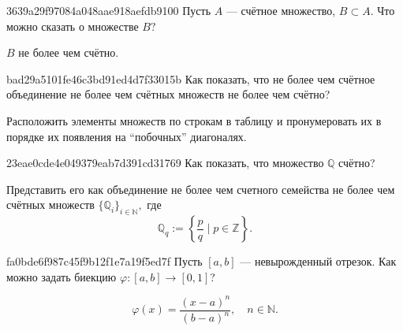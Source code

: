     \begin{note}{3639a29f97084a048aae918aefdb9100}
        Пусть $A$ --- счётное множество, \( B \subset A. \) Что можно сказать о
        множестве \( B? \)

        \begin{cloze}{1}
            \( B \) не более чем счётно.
        \end{cloze}
    \end{note}

    \begin{note}{bad29a5101fe46c3bd91ed4d7f33015b}
        Как показать, что не более чем счётное объединение не более чем счётных
        множеств не более чем счётно?

        \begin{cloze}{1}
            Расположить элементы множеств по строкам в таблицу и пронумеровать
            их в порядке их появления на ``побочных'' диагоналях.
        \end{cloze}
    \end{note}

    \begin{note}{23eae0cde4e049379eab7d391cd31769}
        Как показать, что множество \( \mathbb Q  \) счётно?

        \begin{cloze}{1}
            Представить его как объединение не более чем счетного семейства не
            более чем счётных множеств \( \{ \mathbb Q _i \}_{i \in \mathbb N }
            , \) где \[
                \mathbb Q _q := \left\{ \frac{p}{q} \mid p \in \mathbb Z  \right\}.
            \]
        \end{cloze}
    \end{note}

    \begin{note}{fa0bde6f987c45f9b12f1e7a19f5ed7f}
        Пусть \( [a,  b] \) --- невырожденный отрезок. Как можно задать биекцию
        \( \varphi : [a,  b] \to [0, 1] \)?

        \begin{cloze}{1}
            \[
                \varphi(x) = \frac{(x - a)^{n}}{(b - a)^{n}}, \quad n \in
                \mathbb N.
            \]
        \end{cloze}
    \end{note}

